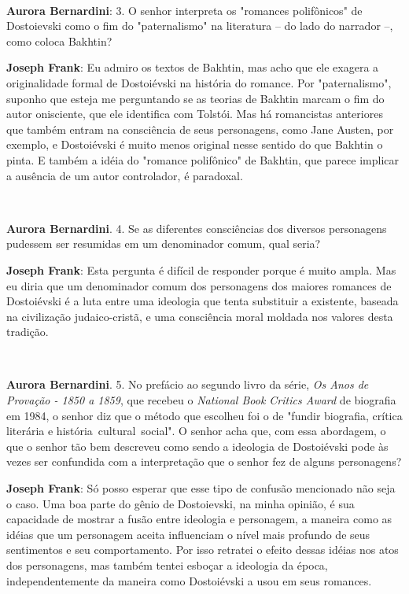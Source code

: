 ~

\textbf{Aurora Bernardini}: 3. O senhor interpreta os "romances
polifônicos" de Dostoievski como o fim do "paternalismo" na literatura
-- do lado do narrador --, como coloca Bakhtin?

\textbf{Joseph Frank}: Eu admiro os textos de Bakhtin, mas acho que ele
exagera a originalidade formal de Dostoiévski na história do romance.
Por "paternalismo", suponho que esteja me perguntando se as teorias de
Bakhtin marcam o fim do autor onisciente, que ele identifica com
Tolstói. Mas há romancistas anteriores que também entram na consciência
de seus personagens, como Jane Austen, por exemplo, e Dostoiévski é
muito menos original nesse sentido do que Bakhtin o pinta. E também a
idéia do "romance polifônico" de Bakhtin, que parece implicar a ausência
de um autor controlador, é paradoxal.

~

\textbf{Aurora Bernardini}. 4. Se as diferentes consciências dos
diversos personagens pudessem ser resumidas em um denominador comum,
qual seria?

\textbf{Joseph Frank}: Esta pergunta é difícil de responder porque é
muito ampla. Mas eu diria que um denominador comum dos personagens dos
maiores romances de Dostoiévski é a luta entre uma ideologia que tenta
substituir a existente, baseada na civilização judaico-cristã, e uma
consciência moral moldada nos valores desta tradição.

~

\textbf{Aurora Bernardini}. 5. No prefácio ao segundo livro da série,
\emph{Os Anos de Provação - 1850 a 1859}, que recebeu o \emph{National
Book Critics Award} de biografia em 1984, o senhor diz que o método que
escolheu foi o de "fundir biografia, crítica literária e
história~cultural~social". O senhor acha que, com essa abordagem, o que
o senhor tão bem descreveu como sendo a ideologia de Dostoiévski pode às
vezes ser confundida com a interpretação que o senhor fez de alguns
personagens?

\textbf{Joseph Frank}: Só posso esperar que esse tipo de confusão
mencionado não seja o caso. Uma boa parte do gênio de Dostoievski, na
minha opinião, é sua capacidade de mostrar a fusão entre ideologia e
personagem, a maneira como as idéias que um personagem aceita
influenciam o nível mais profundo de seus sentimentos e seu
comportamento. Por isso retratei o efeito dessas idéias nos atos dos
personagens, mas também tentei esboçar a ideologia da época,
independentemente da maneira como Dostoiévski a usou em seus romances.

